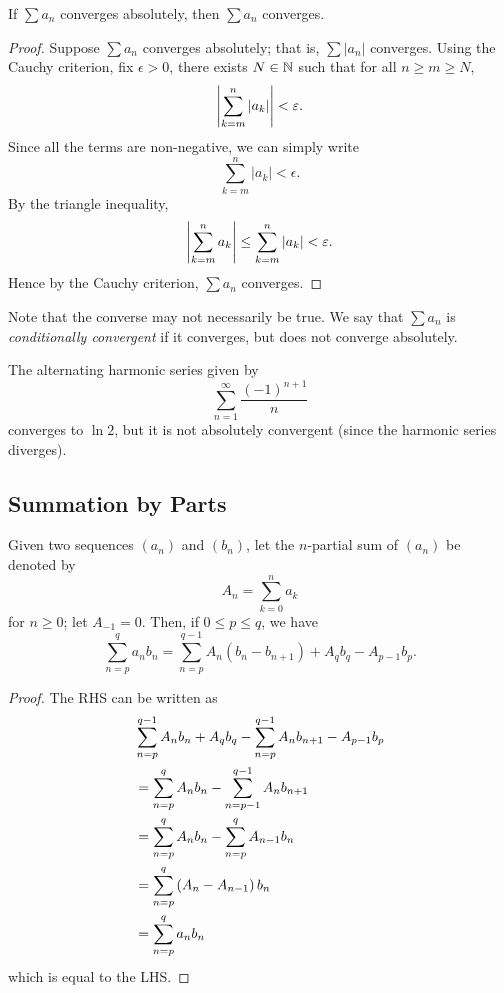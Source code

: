 \begin{lemma}\label{lemma:absolute-convergence}
If $\sum a_n$ converges absolutely, then $\sum a_n$ converges.
\end{lemma}

\begin{proof}
Suppose $\sum a_n$ converges absolutely; that is, $\sum|a_n|$ converges. Using the Cauchy criterion, fix $\epsilon>0$, there exists $N\in\mathbb N$ such that for all $n\ge m\ge N$,
\[\left|\sum_{k=m}^{n}|a_k|\right|<\varepsilon.\]
Since all the terms are non-negative, we can simply write
\[\sum_{k=m}^{n}|a_k|<\epsilon.\]
By the triangle inequality,
\[\left|\sum_{k=m}^{n}a_k\right|\le\sum_{k=m}^{n}|a_k|<\varepsilon.\]
Hence by the Cauchy criterion, $\sum a_n$ converges.
\end{proof}

Note that the converse may not necessarily be true. We say that $\sum a_n$ is \emph{conditionally convergent} if it converges, but does not converge absolutely.

\begin{example}
The alternating harmonic series given by
\[\sum_{n=1}^{\infty}\frac{(-1)^{n+1}}{n}\]
converges to $\ln 2$, but it is not absolutely convergent (since the harmonic series diverges).
\end{example}
\pagebreak

\subsection{Summation by Parts}
\begin{proposition}\label{prop:part-sum-formula}
Given two sequences $(a_n)$ and $(b_n)$, let the $n$-partial sum of $(a_n)$ be denoted by
\[A_n=\sum_{k=0}^{n}a_k\]
for $n\ge0$; let $A_{-1}=0$. Then, if $0\le p\le q$, we have
\[\sum_{n=p}^{q}a_nb_n=\sum_{n=p}^{q-1}A_n(b_n-b_{n+1})+A_qb_q-A_{p-1}b_p.\]
\end{proposition}

\begin{proof}
The RHS can be written as
\begin{align*}
&\sum_{n=p}^{q-1}A_nb_n+A_qb_q-\sum_{n=p}^{q-1}A_nb_{n+1}-A_{p-1}b_p\\
&=\sum_{n=p}^{q}A_nb_n-\sum_{n=p-1}^{q-1}A_nb_{n+1}\\
&=\sum_{n=p}^{q}A_nb_n-\sum_{n=p}^{q}A_{n-1}b_n\\
&=\sum_{n=p}^{q}\left(A_n-A_{n-1}\right)b_n\\
&=\sum_{n=p}^{q}a_nb_n
\end{align*}
which is equal to the LHS.
\end{proof}

